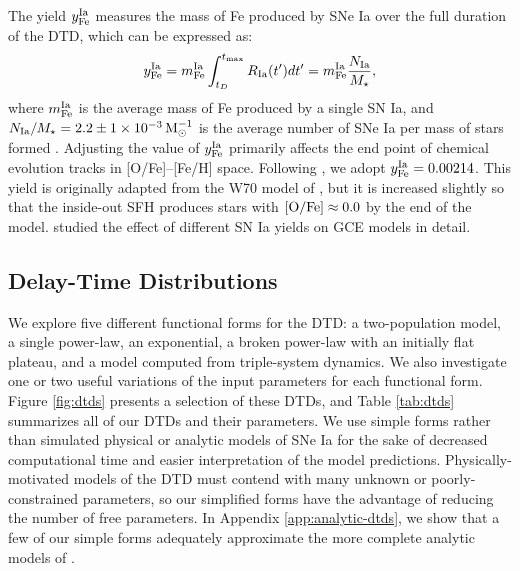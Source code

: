 \documentclass[twocolumn,twocolappendix,linenumbers]{aastex631}
\begin{document}
The yield $y_{\rm Fe}^{\rm Ia}$ measures the mass of Fe produced by SNe Ia over the full duration of the DTD, which can be expressed as:
\begin{equation}
    y_{\rm Fe}^{\rm Ia} = m_{\rm Fe}^{\rm Ia} \int_{t_D}^{t_{\rm max}} R_{\rm Ia}(t')dt' = m_{\rm Fe}^{\rm Ia} \frac{N_{\rm Ia}}{M_\star},
    \label{eq:dtd-integral}
\end{equation}
where $m_{\rm Fe}^{\rm Ia}$ is the average mass of Fe produced by a single SN Ia, and $N_{\rm Ia}/M_\star=2.2\pm1\times10^{-3}\,{\rm M}_\odot^{-1}$ is the average number of SNe Ia per mass of stars formed \citep{MaozMannucci2012-SNeIaReview}. 
Adjusting the value of $y_{\rm Fe}^{\rm Ia}$ primarily affects the end point of chemical evolution tracks in [O/Fe]--[Fe/H] space. 
Following , we adopt $y_{\rm Fe}^{\rm Ia}=0.00214$. This yield is originally adapted from the W70 model of \citet{Iwamoto1999-SNIaYields}, but it is increased slightly so that the inside-out SFH produces stars with ${\rm [O/Fe]}\approx 0.0$ by the end of the model.
\citet{Palla2021-SNIaYield} studied the effect of different SN Ia yields on GCE models in detail.

\subsection{Delay-Time Distributions}
\label{sec:dtd-models}

We explore five different functional forms for the DTD: a two-population model, a single power-law, an exponential, a broken power-law with an initially flat plateau, and a model computed from triple-system dynamics. We also investigate one or two useful variations of the input parameters for each functional form. Figure \ref{fig:dtds} presents a selection of these DTDs, and Table \ref{tab:dtds} summarizes all of our DTDs and their parameters. We use simple forms rather than simulated physical or analytic models of SNe Ia for the sake of decreased computational time and easier interpretation of the model predictions. Physically-motivated models of the DTD must contend with many unknown or poorly-constrained parameters, so our simplified forms have the advantage of reducing the number of free parameters. In Appendix \ref{app:analytic-dtds}, we show that a few of our simple forms adequately approximate the more complete analytic models of \citet{Greggio2005-AnalyticalRates}. 
\end{document}
